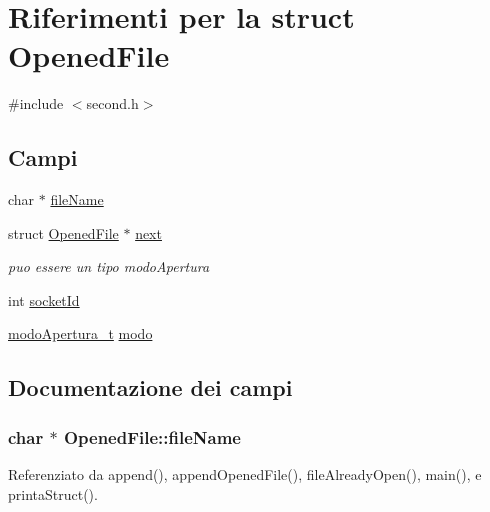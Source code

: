 \hypertarget{structOpenedFile}{}\section{Riferimenti per la struct Opened\+File}
\label{structOpenedFile}


{\ttfamily \#include $<$second.\+h$>$}

\subsection*{Campi}
\begin{DoxyCompactItemize}
\item 
char $\ast$ \hyperlink{structOpenedFile_abcff0610dfa8b1e3836b3f5bac40c8f5}{file\+Name}
\item 
struct \hyperlink{structOpenedFile}{Opened\+File} $\ast$ \hyperlink{structOpenedFile_a9b8c8b995cdda6da249a6ce9a9df98b2}{next}
\begin{DoxyCompactList}\small\item\em puo\textquotesingle{} essere un tipo modo\+Apertura \end{DoxyCompactList}\item 
int \hyperlink{structOpenedFile_a2af35018ecff06dbd349d464c815038a}{socket\+Id}
\item 
\hyperlink{enum_8c_a6880e4562590c12cf8c358fa5f779bb2}{modo\+Apertura\+\_\+t} \hyperlink{structOpenedFile_ab2345215b095722d1339d571cfe287c7}{modo}
\end{DoxyCompactItemize}


\subsection{Documentazione dei campi}
\hypertarget{structOpenedFile_abcff0610dfa8b1e3836b3f5bac40c8f5}{}
\subsubsection[{file\+Name}]{\setlength{\rightskip}{0pt plus 5cm}char $\ast$ Opened\+File\+::file\+Name}\label{structOpenedFile_abcff0610dfa8b1e3836b3f5bac40c8f5}


Referenziato da append(), append\+Opened\+File(), file\+Already\+Open(), main(), e printa\+Struct().

\hypertarget{structOpenedFile_ab2345215b095722d1339d571cfe287c7}{}
